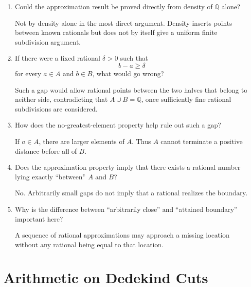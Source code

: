 \documentclass{self-check}
\begin{document}
\begin{enumerate}[label=\arabic{*}., itemsep=10pt]
    \begin{answer}
      This is a property of \(\mathbb{Q}\) and \(\mathbb{N}\) and can be proved without real completeness.
    \end{answer}
  \item Could the approximation result be proved directly from density of \(\mathbb{Q}\) alone?

    \begin{answer}
      Not by density alone in the most direct argument. Density inserts points between known rationals but does not by itself give a uniform finite subdivision argument.
    \end{answer}
  \item If there were a fixed rational \(\delta>0\) such that
    \[ b-a\ge\delta \]
    for every \(a\in A\) and \(b\in B\), what would go wrong?

    \begin{answer}
      Such a gap would allow rational points between the two halves that belong to neither side, contradicting that \(A\cup B=\mathbb{Q}\), once sufficiently fine rational subdivisions are considered.
    \end{answer}
  \item How does the no-greatest-element property help rule out such a gap?

    \begin{answer}
      If \(a\in A\), there are larger elements of \(A\). Thus \(A\) cannot terminate a positive distance before all of \(B\).
    \end{answer}
  \item Does the approximation property imply that there exists a rational number lying exactly ``between'' \(A\) and \(B\)?

    \begin{answer}
      No. Arbitrarily small gaps do not imply that a rational realizes the boundary.
    \end{answer}
  \item Why is the difference between ``arbitrarily close'' and ``attained boundary'' important here?

    \begin{answer}
      A sequence of rational approximations may approach a missing location without any rational being equal to that location.
    \end{answer}
\end{enumerate}

\section{Arithmetic on Dedekind Cuts}
\end{document}
